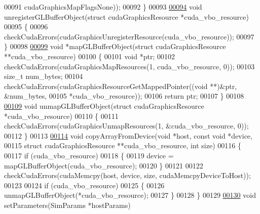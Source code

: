 \begin{DoxyCode}
00091                                                      cudaGraphicsMapFlagsNone));
00092     \}
00093 
\hypertarget{particle_system__cuda_8cu_source_l00094}{}\hyperlink{particle_system__cuda_8cu_a9afef8c00ca779aae2d7484b45bce34c}{00094}     \textcolor{keywordtype}{void} unregisterGLBufferObject(\textcolor{keyword}{struct} cudaGraphicsResource *cuda\_vbo\_resource)
00095     \{
00096         checkCudaErrors(cudaGraphicsUnregisterResource(cuda\_vbo\_resource));
00097     \}
00098 
\hypertarget{particle_system__cuda_8cu_source_l00099}{}\hyperlink{particle_system__cuda_8cu_aa491077afd740a269815eb9ce81c8642}{00099}     \textcolor{keywordtype}{void} *mapGLBufferObject(\textcolor{keyword}{struct} cudaGraphicsResource **cuda\_vbo\_resource)
00100     \{
00101         \textcolor{keywordtype}{void} *ptr;
00102         checkCudaErrors(cudaGraphicsMapResources(1, cuda\_vbo\_resource, 0));
00103         size\_t num\_bytes;
00104         checkCudaErrors(cudaGraphicsResourceGetMappedPointer((\textcolor{keywordtype}{void} **)&ptr, &num\_bytes,
00105                                                              *cuda\_vbo\_resource));
00106         \textcolor{keywordflow}{return} ptr;
00107     \}
00108 
\hypertarget{particle_system__cuda_8cu_source_l00109}{}\hyperlink{particle_system__cuda_8cu_a98c3325419b7528d34a51ca7972d7095}{00109}     \textcolor{keywordtype}{void} unmapGLBufferObject(\textcolor{keyword}{struct} cudaGraphicsResource *cuda\_vbo\_resource)
00110     \{
00111         checkCudaErrors(cudaGraphicsUnmapResources(1, &cuda\_vbo\_resource, 0));
00112     \}
00113 
\hypertarget{particle_system__cuda_8cu_source_l00114}{}\hyperlink{particle_system__cuda_8cu_a54716407dbd516db34f42b2faf7f91a3}{00114}     \textcolor{keywordtype}{void} copyArrayFromDevice(\textcolor{keywordtype}{void} *host, \textcolor{keyword}{const} \textcolor{keywordtype}{void} *device,
00115                              \textcolor{keyword}{struct} cudaGraphicsResource **cuda\_vbo\_resource, \textcolor{keywordtype}{int} size)
00116     \{
00117         \textcolor{keywordflow}{if} (cuda\_vbo\_resource)
00118         \{
00119             device = mapGLBufferObject(cuda\_vbo\_resource);
00120         \}
00121 
00122         checkCudaErrors(cudaMemcpy(host, device, size, cudaMemcpyDeviceToHost));
00123 
00124         \textcolor{keywordflow}{if} (cuda\_vbo\_resource)
00125         \{
00126             unmapGLBufferObject(*cuda\_vbo\_resource);
00127         \}
00128     \}
00129 
\hypertarget{particle_system__cuda_8cu_source_l00130}{}\hyperlink{particle_system__cuda_8cu_a342176dbaba2668312c45e1a1423fc4e}{00130}     \textcolor{keywordtype}{void} setParameters(SimParams *hostParams)

\end{DoxyCode}

